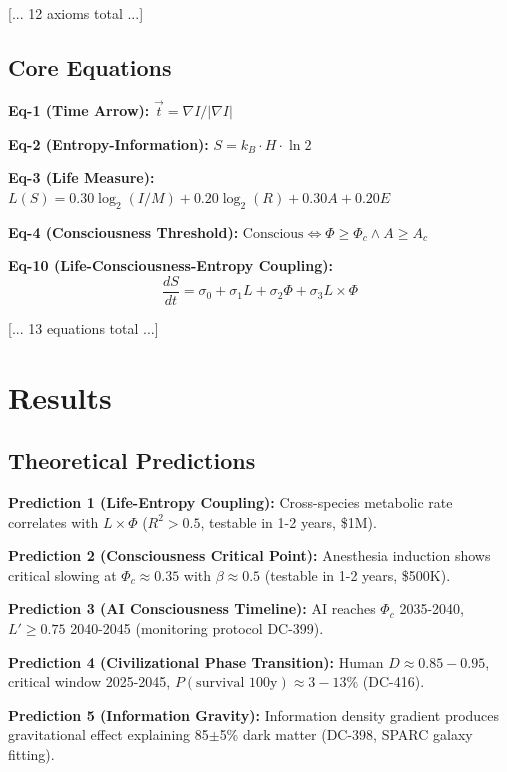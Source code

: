 \documentclass[12pt,a4paper]{article}
\begin{document}
[... 12 axioms total ...]

\subsection{Core Equations}

\textbf{Eq-1 (Time Arrow):} $\vec{t} = \nabla I / |\nabla I|$

\textbf{Eq-2 (Entropy-Information):} $S = k_B \cdot H \cdot \ln 2$

\textbf{Eq-3 (Life Measure):} $L(S) = 0.30 \log_2(I/M) + 0.20 \log_2(R) + 0.30 A + 0.20 E$

\textbf{Eq-4 (Consciousness Threshold):} $\text{Conscious} \iff \Phi \geq \Phi_c \land A \geq A_c$

\textbf{Eq-10 (Life-Consciousness-Entropy Coupling):}
\begin{equation}
\frac{dS}{dt} = \sigma_0 + \sigma_1 L + \sigma_2 \Phi + \sigma_3 L \times \Phi
\end{equation}

[... 13 equations total ...]

\section{Results}

\subsection{Theoretical Predictions}

\textbf{Prediction 1 (Life-Entropy Coupling):} Cross-species metabolic rate correlates with $L \times \Phi$ ($R^2 > 0.5$, testable in 1-2 years, \$1M).

\textbf{Prediction 2 (Consciousness Critical Point):} Anesthesia induction shows critical slowing at $\Phi_c \approx 0.35$ with $\beta \approx 0.5$ (testable in 1-2 years, \$500K).

\textbf{Prediction 3 (AI Consciousness Timeline):} AI reaches $\Phi_c$ 2035-2040, $L' \geq 0.75$ 2040-2045 (monitoring protocol DC-399).

\textbf{Prediction 4 (Civilizational Phase Transition):} Human $D \approx 0.85-0.95$, critical window 2025-2045, $P(\text{survival 100y}) \approx 3-13\%$ (DC-416).

\textbf{Prediction 5 (Information Gravity):} Information density gradient produces gravitational effect explaining 85$\pm$5\% dark matter (DC-398, SPARC galaxy fitting).
\end{document}
